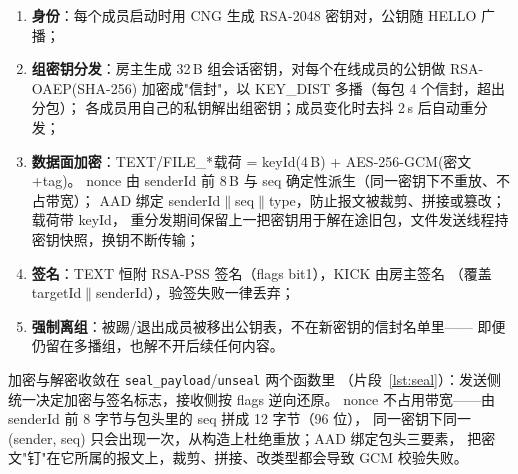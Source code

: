\documentclass[11pt,a4paper,fontset=fandol]{ctexart}
\begin{document}
\begin{enumerate}[itemsep=1pt,topsep=2pt]
  \item \textbf{身份}：每个成员启动时用 CNG 生成 RSA-2048 密钥对，公钥随 HELLO 广播；
  \item \textbf{组密钥分发}：房主生成 32\,B 组会话密钥，对每个在线成员的公钥做
        RSA-OAEP(SHA-256) 加密成"信封"，以 KEY\_DIST 多播（每包 4 个信封，超出分包）；
        各成员用自己的私钥解出组密钥；成员变化时去抖 2\,s 后自动重分发；
  \item \textbf{数据面加密}：TEXT/FILE\_*$^{}$载荷 = keyId(4\,B) + AES-256-GCM(密文+tag)。
        nonce 由 senderId 前 8\,B 与 seq 确定性派生（同一密钥下不重放、不占带宽）；
        AAD 绑定 senderId$\|$seq$\|$type，防止报文被裁剪、拼接或篡改；载荷带 keyId，
        重分发期间保留上一把密钥用于解在途旧包，文件发送线程持密钥快照，换钥不断传输；
  \item \textbf{签名}：TEXT 恒附 RSA-PSS 签名（flags bit1），KICK 由房主签名
        （覆盖 targetId$\|$senderId），验签失败一律丢弃；
  \item \textbf{强制离组}：被踢/退出成员被移出公钥表，不在新密钥的信封名单里——
        即便仍留在多播组，也解不开后续任何内容。
\end{enumerate}

\noindent 加密与解密收敛在 \texttt{seal\_payload}/\texttt{unseal} 两个函数里
（片段~\ref{lst:seal}）：发送侧统一决定加密与签名标志，接收侧按 flags 逆向还原。
nonce 不占用带宽——由 senderId 前 8 字节与包头里的 seq 拼成 12 字节（96 位），
同一密钥下同一 (sender, seq) 只会出现一次，从构造上杜绝重放；AAD 绑定包头三要素，
把密文"钉"在它所属的报文上，裁剪、拼接、改类型都会导致 GCM 校验失败。
\end{document}
